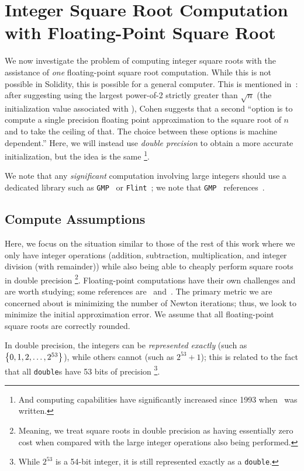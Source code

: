\section{Integer Square Root Computation with Floating-Point Square Root}
\label{app:isqrt_with_float_sqrt}

We now investigate the problem of computing integer square roots
with the assistance of \emph{one} floating-point square root computation.
While this is not possible in Solidity,
this is possible for a general computer.
This is mentioned in~\cite[Chapter 1.7, Remarks]{cohen1993}:
after suggesting using the largest power-of-2 strictly greater than $\sqrt{n}$
(the initialization value associated with \UnrolledTwo{}),
Cohen suggests that a second
``option is to compute a single precision floating point
approximation to the square root of $n$ and to take the ceiling of that.
The choice between these options is machine dependent.''
Here, we will instead use \emph{double precision}
to obtain a more accurate initialization,
but the idea is the same%
\footnote{And computing capabilities have significantly increased
since 1993 when~\cite{cohen1993} was written.}.

We note that any \emph{significant} computation involving large integers
should use a dedicated library
such as \texttt{GMP}~\cite{gmplib} or \texttt{Flint}~\cite{flint};
we note that \texttt{GMP}~\cite{gmplib}
references~\cite{zimmermann:inria-00072854}.


\subsection{Compute Assumptions}

Here, we focus on the situation similar to those of the rest of this work
where we only have integer operations
(addition, subtraction, multiplication, and integer division (with remainder))
while also being able to cheaply
perform square roots in double precision%
\footnote{Meaning, we treat square roots in double precision
as having essentially zero cost when compared with the
large integer operations also being performed.}.
Floating-point computations have their own challenges
and are worth studying;
some references are~\cite{HighamASNA}
and~\cite[Chapter 4.2]{taocp2}.
The primary metric we are concerned about is minimizing the number
of Newton iterations;
thus, we look to minimize the initial approximation error.
We assume that all floating-point square roots
are correctly rounded.

In double precision, the integers can be \emph{represented exactly}
(such as $\left\{ 0, 1, 2, \dots, 2^{53} \right\}$),
while others cannot (such as $2^{53} + 1$);
this is related to the fact that all \texttt{double}s have
53 bits of precision%
\footnote{While $2^{53}$ is a 54-bit integer,
it is still represented exactly as a \texttt{double}.}.


